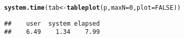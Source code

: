 \documentclass[11pt, fleqn, a4paper]{article}\usepackage[]{graphicx}\usepackage[]{color}
\makeatletter
\newcommand{\hlnum}[1]{\textcolor[rgb]{0.686,0.059,0.569}{#1}}%
\newcommand{\hlstd}[1]{\textcolor[rgb]{0.345,0.345,0.345}{#1}}%
\newcommand{\hlkwb}[1]{\textcolor[rgb]{0.69,0.353,0.396}{#1}}%
\newcommand{\hlkwc}[1]{\textcolor[rgb]{0.333,0.667,0.333}{#1}}%
\newcommand{\hlkwd}[1]{\textcolor[rgb]{0.737,0.353,0.396}{\textbf{#1}}}%
\newenvironment{kframe}{%
 \def\at@end@of@kframe{}%
 \ifinner\ifhmode%
  \def\at@end@of@kframe{\end{minipage}}%
  \begin{minipage}{\columnwidth}%
 \fi\fi%
 \def\FrameCommand##1{\hskip\@totalleftmargin \hskip-\fboxsep
 \colorbox{shadecolor}{##1}\hskip-\fboxsep
     \hskip-\linewidth \hskip-\@totalleftmargin \hskip\columnwidth}%
 \MakeFramed {\advance\hsize-\width
   \@totalleftmargin\z@ \linewidth\hsize
   \@setminipage}}%
 {\par\unskip\endMakeFramed%
 \at@end@of@kframe}
\newenvironment{knitrout}{}{} %
\makeatother
\begin{document}
\begin{knitrout}
\color{fgcolor}\begin{kframe}
\begin{alltt}
\hlkwd{system.time}\hlstd{(tab} \hlkwb{<-} \hlkwd{tableplot}\hlstd{(p,} \hlkwc{maxN} \hlstd{=} \hlnum{0}\hlstd{,} \hlkwc{plot} \hlstd{=} \hlnum{FALSE}\hlstd{))}
\end{alltt}
\begin{verbatim}
##    user  system elapsed 
##    6.49    1.34    7.99
\end{verbatim}
\end{kframe}
\end{knitrout}
\end{document}
